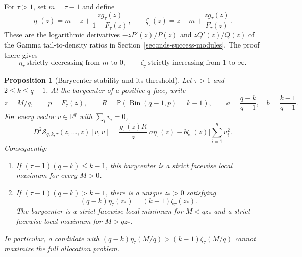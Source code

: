 \documentclass[11pt]{article}
\newtheorem{proposition}[theorem]{Proposition}
\theoremstyle{definition}
\theoremstyle{remark}
\DeclareMathOperator{\Bin}{Bin}
\newcommand{\Pbb}{\mathbb P}
\newcommand{\R}{\mathbb R}
\newcommand{\1}{\mathbf 1}
\begin{document}
For \(\tau>1\), set \(m=\tau-1\) and define
\begin{equation}\label{eq:mds-stability-elasticities}
  \eta_\tau(z)=m-z+\frac{z g_\tau(z)}{1-F_\tau(z)},
  \qquad
  \zeta_\tau(z)=z-m+\frac{z g_\tau(z)}{F_\tau(z)}.
\end{equation}
These are the logarithmic derivatives
\(-zP'(z)/P(z)\) and \(zQ'(z)/Q(z)\) of the Gamma tail-to-density
ratios in Section~\ref{sec:mds-success-modules}.  The proof there gives
\[
  \eta_\tau\ \text{strictly decreasing from }m\text{ to }0,
  \qquad
  \zeta_\tau\ \text{strictly increasing from }1\text{ to }\infty.
\]

\begin{proposition}[Barycenter stability and its threshold]
\label{prop:mds-barycenter-stability}
Let \(\tau>1\) and \(2\le k\le q-1\).  At the barycenter of a
positive \(q\)-face, write
\[
  z=M/q,\qquad p=F_\tau(z),\qquad
  R=\Pbb(\Bin(q-1,p)=k-1),
  \qquad
  a=\frac{q-k}{q-1},\quad b=\frac{k-1}{q-1}.
\]
For every vector \(v\in\R^q\) with \(\sum_i v_i=0\),
\begin{equation}\label{eq:mds-barycenter-hessian}
  D^2\mathcal S_{q,k,\tau}(z,\ldots,z)[v,v]
  =\frac{g_\tau(z)R}{z}
    \bigl[a\eta_\tau(z)-b\zeta_\tau(z)\bigr]
    \sum_{i=1}^q v_i^2.
\end{equation}
Consequently:
\begin{enumerate}[label=(\roman*)]
  \item If \((\tau-1)(q-k)\le k-1\), this barycenter is a strict
  facewise local maximum for every \(M>0\).
  \item If \((\tau-1)(q-k)>k-1\), there is a unique \(z_*>0\)
  satisfying
  \begin{equation}\label{eq:mds-stability-threshold}
    (q-k)\eta_\tau(z_*)=(k-1)\zeta_\tau(z_*).
  \end{equation}
  The barycenter is a strict facewise local minimum for \(M<qz_*\)
  and a strict facewise local maximum for \(M>qz_*\).
\end{enumerate}
In particular, a candidate with
\((q-k)\eta_\tau(M/q)>(k-1)\zeta_\tau(M/q)\) cannot maximize
the full allocation problem.
\end{proposition}
\end{document}
